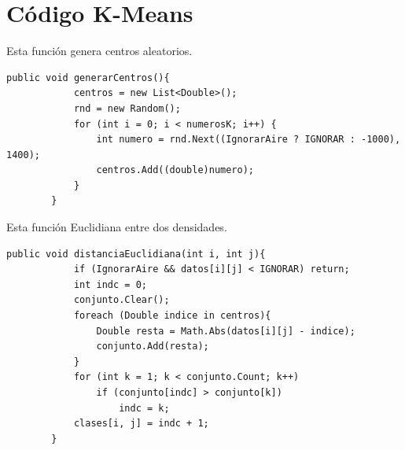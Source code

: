 \documentclass[12pt]{report}
\begin{document}
\appendix
\chapter{Código K-Means}

Esta función genera centros aleatorios.
\lstset{language=C, breaklines=true, basicstyle=\footnotesize}
\lstset{numbers=left, numberstyle=\tiny, stepnumber=1, numbersep=-2pt}
\begin{lstlisting}[frame=single]
	public void generarCentros(){
            centros = new List<Double>();
            rnd = new Random();
            for (int i = 0; i < numerosK; i++) {
                int numero = rnd.Next((IgnorarAire ? IGNORAR : -1000), 1400);
                centros.Add((double)numero);
            }
        }
\end{lstlisting}

\vspace*{1cm}
Esta función Euclidiana entre dos densidades. 
\lstset{language=C, breaklines=true, basicstyle=\footnotesize}
\lstset{numbers=left, numberstyle=\tiny, stepnumber=1, numbersep=-2pt}
\begin{lstlisting}[frame=single]
	public void distanciaEuclidiana(int i, int j){
            if (IgnorarAire && datos[i][j] < IGNORAR) return;
            int indc = 0;
            conjunto.Clear();
            foreach (Double indice in centros){
                Double resta = Math.Abs(datos[i][j] - indice);
                conjunto.Add(resta);
            }
            for (int k = 1; k < conjunto.Count; k++)
                if (conjunto[indc] > conjunto[k])
                    indc = k;
            clases[i, j] = indc + 1;
        }
\end{lstlisting}
\end{document}
